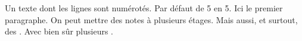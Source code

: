 \beginnumbering
\pstart
Un texte dont les lignes sont numérotés.
Par défaut de 5 en 5.
Ici le premier paragraphe.
On peut mettre des notes à plusieurs étages.
Mais aussi, et surtout, des
.
Avec bien sûr plusieurs .
\pend
\endnumbering
